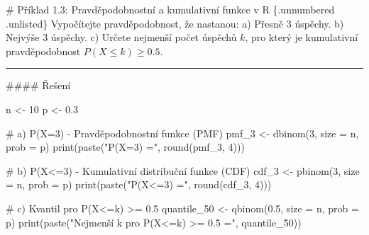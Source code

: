 \documentclass[
  czech,
  11pt,
  letterpaper,
  DIV=11,
  numbers=noendperiod]{scrreprt}
\newenvironment{Shaded}{\begin{snugshade}}{\end{snugshade}}
\newcommand{\AttributeTok}[1]{\textcolor[rgb]{0.40,0.45,0.13}{#1}}
\newcommand{\CommentTok}[1]{\textcolor[rgb]{0.37,0.37,0.37}{#1}}
\newcommand{\DecValTok}[1]{\textcolor[rgb]{0.68,0.00,0.00}{#1}}
\newcommand{\FloatTok}[1]{\textcolor[rgb]{0.68,0.00,0.00}{#1}}
\newcommand{\FunctionTok}[1]{\textcolor[rgb]{0.28,0.35,0.67}{#1}}
\newcommand{\NormalTok}[1]{\textcolor[rgb]{0.00,0.23,0.31}{#1}}
\newcommand{\OtherTok}[1]{\textcolor[rgb]{0.00,0.23,0.31}{#1}}
\newcommand{\StringTok}[1]{\textcolor[rgb]{0.13,0.47,0.30}{#1}}
\begin{document}
\begin{tcolorbox}[enhanced jigsaw, arc=.35mm, bottomrule=.15mm, bottomtitle=1mm, breakable, colback=white, colbacktitle=quarto-callout-note-color!10!white, colframe=quarto-callout-note-color-frame, coltitle=black, left=2mm, leftrule=.75mm, opacityback=0, opacitybacktitle=0.6, rightrule=.15mm, title=\textcolor{quarto-callout-note-color}{\faInfo}\hspace{0.5em}{Poznámka}, titlerule=0mm, toprule=.15mm, toptitle=1mm]

\# Příklad 1.3: Pravděpodobnostní a kumulativní funkce v R \{.unnumbered
.unlisted\} Vypočítejte pravděpodobnost, že nastanou: a) Přesně 3
úspěchy. b) Nejvýše 3 úspěchy. c) Určete nejmenší počet úspěchů \(k\),
pro který je kumulativní pravděpodobnost \(P(X \le k) \ge 0.5\).

\begin{center}\rule{0.5\linewidth}{0.5pt}\end{center}

\#\#\#\# Řešení

\begin{Shaded}
\begin{Highlighting}[]
\NormalTok{n }\OtherTok{\textless{}{-}} \DecValTok{10}
\NormalTok{p }\OtherTok{\textless{}{-}} \FloatTok{0.3}

\CommentTok{\# a) P(X=3) {-} Pravděpodobnostní funkce (PMF)}
\NormalTok{pmf\_3 }\OtherTok{\textless{}{-}} \FunctionTok{dbinom}\NormalTok{(}\DecValTok{3}\NormalTok{, }\AttributeTok{size =}\NormalTok{ n, }\AttributeTok{prob =}\NormalTok{ p)}
\FunctionTok{print}\NormalTok{(}\FunctionTok{paste}\NormalTok{(}\StringTok{"P(X=3) ="}\NormalTok{, }\FunctionTok{round}\NormalTok{(pmf\_3, }\DecValTok{4}\NormalTok{)))}

\CommentTok{\# b) P(X\textless{}=3) {-} Kumulativní distribuční funkce (CDF)}
\NormalTok{cdf\_3 }\OtherTok{\textless{}{-}} \FunctionTok{pbinom}\NormalTok{(}\DecValTok{3}\NormalTok{, }\AttributeTok{size =}\NormalTok{ n, }\AttributeTok{prob =}\NormalTok{ p)}
\FunctionTok{print}\NormalTok{(}\FunctionTok{paste}\NormalTok{(}\StringTok{"P(X\textless{}=3) ="}\NormalTok{, }\FunctionTok{round}\NormalTok{(cdf\_3, }\DecValTok{4}\NormalTok{)))}

\CommentTok{\# c) Kvantil pro P(X\textless{}=k) \textgreater{}= 0.5}
\NormalTok{quantile\_50 }\OtherTok{\textless{}{-}} \FunctionTok{qbinom}\NormalTok{(}\FloatTok{0.5}\NormalTok{, }\AttributeTok{size =}\NormalTok{ n, }\AttributeTok{prob =}\NormalTok{ p)}
\FunctionTok{print}\NormalTok{(}\FunctionTok{paste}\NormalTok{(}\StringTok{"Nejmenší k pro P(X\textless{}=k) \textgreater{}= 0.5 ="}\NormalTok{, quantile\_50))}
\end{Highlighting}
\end{Shaded}

\end{tcolorbox}
\end{document}
